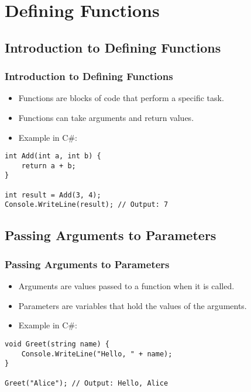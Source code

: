 \section{Defining Functions}

\subsection{Introduction to Defining Functions}
\begin{frame}[fragile]
\frametitle{Introduction to Defining Functions}
\begin{itemize}
    \item Functions are blocks of code that perform a specific task.
    \item Functions can take arguments and return values.
    \item Example in C\#:
\end{itemize}
\begin{lstlisting}
int Add(int a, int b) {
    return a + b;
}

int result = Add(3, 4);
Console.WriteLine(result); // Output: 7
\end{lstlisting}
\end{frame}

\subsection{Passing Arguments to Parameters}
\begin{frame}[fragile]
\frametitle{Passing Arguments to Parameters}
\begin{itemize}
    \item Arguments are values passed to a function when it is called.
    \item Parameters are variables that hold the values of the arguments.
    \item Example in C\#:
\end{itemize}
\begin{lstlisting}
void Greet(string name) {
    Console.WriteLine("Hello, " + name);
}

Greet("Alice"); // Output: Hello, Alice
\end{lstlisting}
\end{frame}

